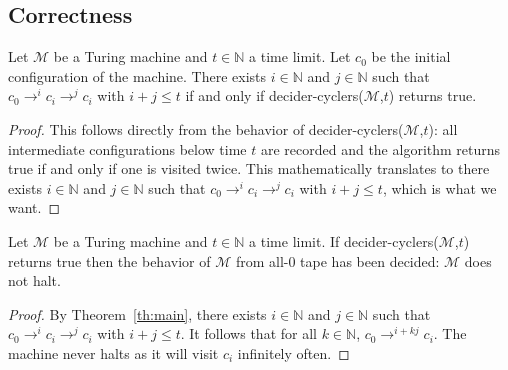 \subsection{Correctness}



\begin{theorem}\label{th:main}\normalfont Let $\mathcal{M}$ be a Turing machine and $t \in \mathbb{N}$ a time limit. Let $c_0$ be the initial configuration of the machine. There exists $i\in\mathbb{N}$ and $j\in\mathbb{N}$ such that $c_0 \to^i c_i \to^j c_i$ with $i+j \leq t$ if and only if {\sc decider-cyclers}($\mathcal{M}$,$t$) returns true.
\end{theorem}
\begin{proof}
        This follows directly from the behavior of {\sc decider-cyclers}($\mathcal{M}$,$t$): all intermediate configurations below time $t$ are recorded and the algorithm returns true if and only if one is visited twice. This mathematically translates to
        there exists $i\in\mathbb{N}$ and $j\in\mathbb{N}$ such that $c_0 \to^i c_i \to^j c_i$ with $i+j \leq t$, which is what we want.
\end{proof}

\begin{corollary}\normalfont
        Let $\mathcal{M}$ be a Turing machine and $t \in \mathbb{N}$ a time limit. If {\sc decider-cyclers}($\mathcal{M}$,$t$) returns true then the behavior of $\mathcal{M}$ from all-0 tape has been decided: $\mathcal{M}$ does not halt.
\end{corollary}
\begin{proof}
        By Theorem~\ref{th:main}, there exists $i\in\mathbb{N}$ and $j\in\mathbb{N}$ such that $c_0 \to^i c_i \to^j c_i$ with $i+j \leq t$. It follows that for all $k\in\mathbb{N}$, $c_0 \to^{i+kj} c_i$. The machine never halts as it will visit $c_i$ infinitely often.
\end{proof}

